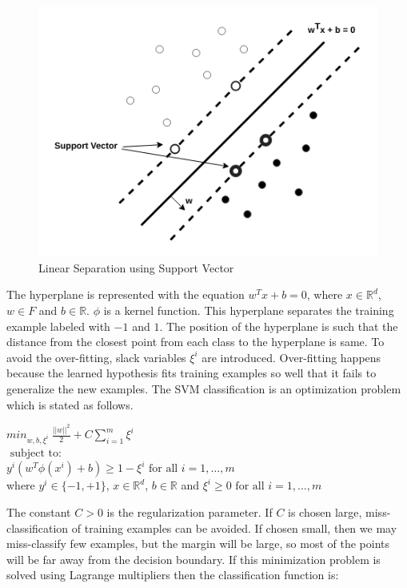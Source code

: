 \documentclass[12pt,oneside,a4paper]{article}
\begin{document}
\begin{figure}[H]
\centering
\includegraphics[scale=0.5]{SVM}
\caption{Linear Separation using Support Vector} \label{fig:SVM}
\end{figure}

The hyperplane is represented with the equation $w^{T} x + b = 0$, where $x \in \mathbb{R}^d$, $w \in F$ and $b \in \mathbb{R}$. $\phi$ is a kernel function. This hyperplane separates the training example labeled with $-1$ and $1$. The position of the hyperplane is such that the distance from the closest point from each class to the hyperplane is same. To avoid the over-fitting, slack variables $\xi^{i}$ are introduced. Over-fitting happens because the learned hypothesis fits training examples so well that it fails to generalize the new examples. The SVM classification is an optimization problem which is stated as follows.\cite{svm} \cite{svm-ml}

\begin{center}
  ${min}_{w,b,\xi^i} \ \frac{||w||^2}{2} + C \sum_{i=1}^m \xi^i$ \\
  $\mbox{ subject to: }$ \\
  $y^i( w^T \phi(x^i) + b) \geq 1 - \xi^i \mbox{ for all } i = 1, \dots, m$ \\
  where $y^{i} \in \{-1, +1\}$, $x \in \mathbb{R}^d$, $b \in \mathbb{R}$ and $\xi^i \geq 0 \mbox{ for all } i = 1, \dots, m$ \\
\end{center}

 The constant $C > 0$ is the regularization parameter. If $C$ is chosen large, miss-classification of training examples can be avoided. If chosen small, then we may miss-classify few examples, but the margin will be large, so most of the points will be far away from the decision boundary. If this minimization problem is solved using Lagrange multipliers then the classification function is:
\end{document}
